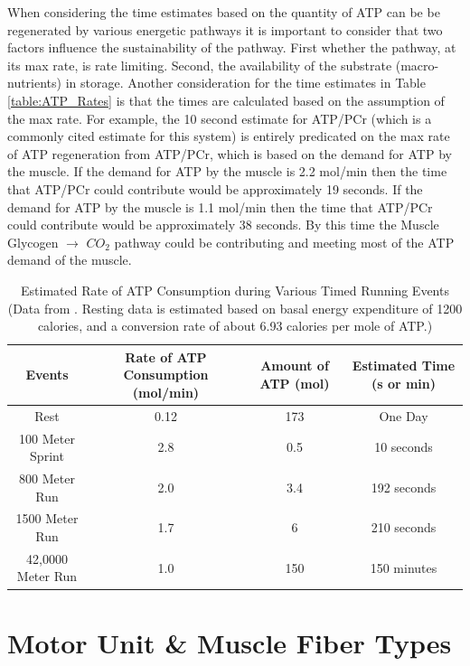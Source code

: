 When considering the time estimates based on the quantity of ATP can be be regenerated by various energetic pathways it is important to consider that two factors influence the sustainability of the pathway. First whether the pathway, at its max rate, is rate limiting. Second, the availability of the substrate (macro-nutrients) in storage. Another consideration for the time estimates in Table \ref{table:ATP_Rates} is that the times are calculated based on the assumption of the max rate. For example, the 10 second estimate for ATP/PCr (which is a commonly cited estimate for this system) is entirely predicated on the max rate of ATP regeneration from ATP/PCr, which is based on the demand for ATP by the muscle. If the demand for ATP by the muscle is 2.2 mol/min then the time that ATP/PCr could contribute would be approximately 19 seconds. If the demand for ATP by the muscle is 1.1 mol/min then the time that ATP/PCr could contribute would be approximately 38 seconds. By this time the Muscle Glycogen $\rightarrow$ $CO_2$ pathway could be contributing and meeting most of the ATP demand of the muscle. 





\begin{table}[h!]
\centering
\begin{tabular}{||c c c c||} 
 \hline
Events & Rate of ATP Consumption (mol/min) & Amount of ATP (mol) & Estimated Time (s or min)\\ [0.5ex] 
 \hline\hline
 Rest & 0.12  & 173 & One Day \\
 100 Meter Sprint & 2.8 & 0.5 & 10 seconds \\ 
 800 Meter Run & 2.0 & 3.4 & 192 seconds\\
 1500 Meter Run & 1.7 & 6 & 210 seconds \\ 
 42,0000 Meter Run & 1.0 & 150 & 150 minutes \\[1ex] 
 \hline
\end{tabular}
\caption{Estimated Rate of ATP Consumption during Various Timed Running Events (\footnotesize{Data from \cite{feher_quantitative_2017}. Resting data is estimated based on basal energy expenditure of 1200 calories, and a conversion rate of about 6.93 calories per mole of ATP.})}
\label{table:Event_ATP_Rates}
\end{table}


\section{Motor Unit \& Muscle Fiber Types}

